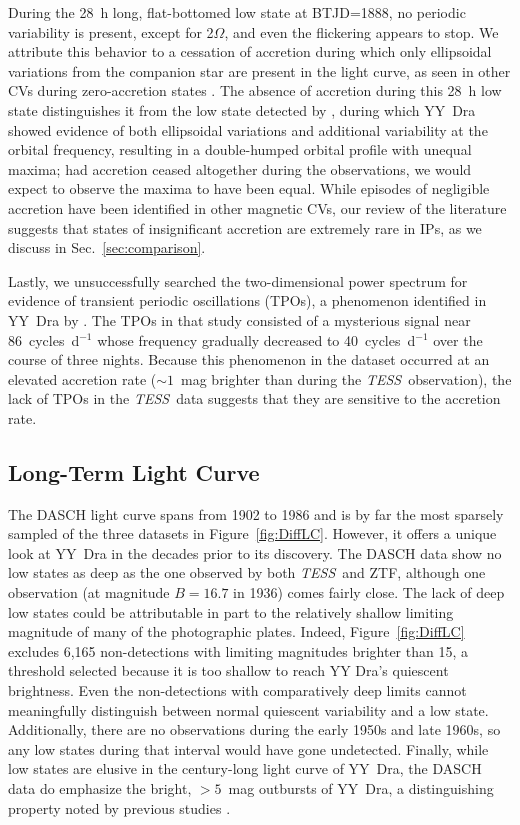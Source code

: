 \documentclass[twocolumn]{aastex63}
\newcommand{\doubleorbit}{2$\Omega$}
\newcommand{\TESS}{\textit{TESS}}
\begin{document}
During the 28~h long, flat-bottomed low state at BTJD=1888, no periodic variability is present, except for \doubleorbit, and even the flickering appears to stop. We attribute this behavior to a cessation of accretion during which only ellipsoidal variations from the companion star are present in the light curve, as seen in other CVs during zero-accretion states \citep[e.g. KR~Aur; ][]{kr_aur}. The absence of accretion during this 28~h low state distinguishes it from the low state detected by \citet{Breus17}, during which YY~Dra showed evidence of both ellipsoidal variations and additional variability at the orbital frequency, resulting in a double-humped orbital profile with unequal maxima; had accretion ceased altogether during the \citet{Breus17} observations, we would expect to observe the maxima to have been equal. While episodes of negligible accretion have been identified in other magnetic CVs, our review of the literature suggests that states of insignificant accretion are extremely rare in IPs, as we discuss in Sec.~\ref{sec:comparison}.

Lastly, we unsuccessfully searched the two-dimensional power spectrum for evidence of transient periodic oscillations (TPOs), a phenomenon identified in YY~Dra by \citet{andronov08}. The TPOs in that study consisted of a mysterious signal near 86~cycles~d$^{-1}$ whose frequency gradually decreased to 40~cycles~d$^{-1}$ over the course of three nights. Because this phenomenon in the \citet{andronov08} dataset occurred at an elevated accretion rate ($\sim1$~mag brighter than during the \TESS\ observation), the lack of TPOs in the \TESS\ data suggests that they are sensitive to the accretion rate. 



\subsection{Long-Term Light Curve}

The DASCH light curve spans from 1902 to 1986 and is by far the most sparsely sampled of the three datasets in Figure~\ref{fig:DiffLC}. However, it offers a unique look at YY~Dra in the decades prior to its discovery. The DASCH data show no low states as deep as the one observed by both \TESS\ and ZTF, although one observation (at magnitude $B=16.7$ in 1936) comes fairly close. The lack of deep low states could be attributable in part to the relatively shallow limiting magnitude of many of the photographic plates. Indeed, Figure~\ref{fig:DiffLC} excludes 6,165 non-detections with limiting magnitudes brighter than 15, a threshold selected because it is too shallow to reach YY Dra's quiescent brightness. Even the non-detections with comparatively deep limits cannot meaningfully distinguish between normal quiescent variability and a low state. Additionally, there are no observations during the early 1950s and late 1960s, so any low states during that interval would have gone undetected. Finally, while low states are elusive in the century-long light curve of YY~Dra, the DASCH data do emphasize the bright, $>5$~mag outbursts of YY~Dra, a distinguishing property noted by previous studies \citep[e.g.,][]{szkody02}.
\end{document}
